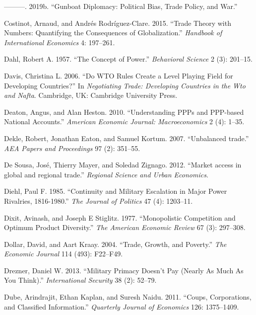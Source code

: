 \documentclass{puthesis}
\newlength{\cslhangindent}
\newenvironment{cslreferences}%
  {\setlength{\parindent}{0pt}%
  \everypar{\setlength{\hangindent}{\cslhangindent}}\ignorespaces}%
  {\par}
\begin{document}
\begin{cslreferences}
\leavevmode\hypertarget{ref-Cooley2019a}{}%
---------. 2019b. ``Gunboat Diplomacy: Political Bias, Trade Policy, and
War.''

\leavevmode\hypertarget{ref-Costinot2015}{}%
Costinot, Arnaud, and Andrés Rodríguez-Clare. 2015. ``Trade Theory with
Numbers: Quantifying the Consequences of Globalization.'' \emph{Handbook
of International Economics} 4: 197--261.

\leavevmode\hypertarget{ref-Dahl1957}{}%
Dahl, Robert A. 1957. ``The Concept of Power.'' \emph{Behavioral
Science} 2 (3): 201--15.

\leavevmode\hypertarget{ref-Davis2006}{}%
Davis, Christina L. 2006. ``Do WTO Rules Create a Level Playing Field
for Developing Countries?'' In \emph{Negotiating Trade: Developing
Countries in the Wto and Nafta}. Cambridge, UK: Cambridge University
Press.

\leavevmode\hypertarget{ref-Deaton2010}{}%
Deaton, Angus, and Alan Heston. 2010. ``Understanding PPPs and PPP-based
National Accounts.'' \emph{American Economic Journal: Macroeconomics} 2
(4): 1--35.

\leavevmode\hypertarget{ref-Dekle2007}{}%
Dekle, Robert, Jonathan Eaton, and Samuel Kortum. 2007. ``Unbalanced
trade.'' \emph{AEA Papers and Proceedings} 97 (2): 351--55.

\leavevmode\hypertarget{ref-deSousa2012}{}%
De Sousa, José, Thierry Mayer, and Soledad Zignago. 2012. ``Market
access in global and regional trade.'' \emph{Regional Science and Urban
Economics}.

\leavevmode\hypertarget{ref-Diehl1985}{}%
Diehl, Paul F. 1985. ``Continuity and Military Escalation in Major Power
Rivalries, 1816-1980.'' \emph{The Journal of Politics} 47 (4): 1203--11.

\leavevmode\hypertarget{ref-Dixit1977}{}%
Dixit, Avinash, and Joseph E Stiglitz. 1977. ``Monopolistic Competition
and Optimum Product Diversity.'' \emph{The American Economic Review} 67
(3): 297--308.

\leavevmode\hypertarget{ref-Dollar2004}{}%
Dollar, David, and Aart Kraay. 2004. ``Trade, Growth, and Poverty.''
\emph{The Economic Journal} 114 (493): F22--F49.

\leavevmode\hypertarget{ref-Drezner2013}{}%
Drezner, Daniel W. 2013. ``Military Primacy Doesn't Pay (Nearly As Much
As You Think).'' \emph{International Security} 38 (2): 52--79.

\leavevmode\hypertarget{ref-Dube2011}{}%
Dube, Arindrajit, Ethan Kaplan, and Suresh Naidu. 2011. ``Coups,
Corporations, and Classified Information.'' \emph{Quarterly Journal of
Economics} 126: 1375--1409.


\end{cslreferences}
\end{document}
